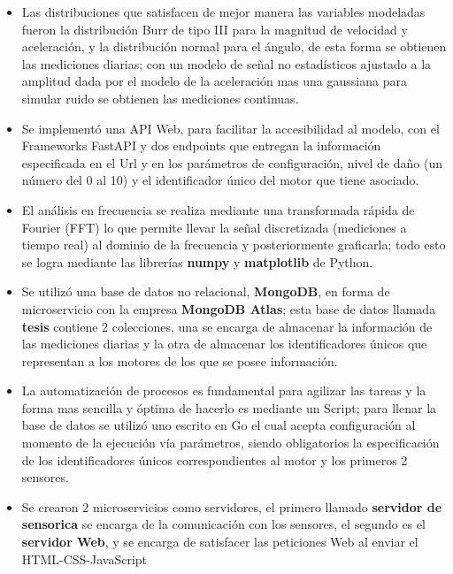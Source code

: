 \begin{itemize}
    \item Las distribuciones que satisfacen de mejor manera las variables
        modeladas fueron la distribución Burr
        de tipo III para la magnitud de velocidad y aceleración, y la distribución
        normal para el ángulo, de esta forma se obtienen las mediciones diarias;
        con un modelo de señal no estadísticos ajustado a la amplitud dada por
        el modelo de la aceleración mas una gaussiana para simular ruido se obtienen
        las mediciones continuas.
    \item Se implementó una API Web, para facilitar la accesibilidad al modelo, con
        el Frameworks FastAPI y dos endpoints que entregan la información especificada
        en el Url y en los parámetros de configuración, nivel de daño (un número del 0 al 10)
        y el identificador único del motor que tiene asociado.
    \item El análisis en frecuencia se realiza mediante una
        transformada rápida de Fourier (FFT) lo que permite llevar la señal
        discretizada (mediciones a tiempo real) al dominio de la frecuencia
        y posteriormente graficarla; todo esto se logra mediante las librerías
        \textbf{numpy} y \textbf{matplotlib} de Python.
    \item  Se utilizó una base de datos no relacional, \textbf{MongoDB}, en forma
        de microservicio con la empresa \textbf{MongoDB Atlas};
        esta base de datos llamada \textbf{tesis}
        contiene 2 colecciones, una se encarga de almacenar la información de las
        mediciones diarias y la otra de almacenar los identificadores únicos que
        representan a los motores de los que se posee información.
    \item La automatización de procesos es fundamental para agilizar las tareas y
        la forma mas sencilla y óptima de hacerlo es mediante un Script; para
        llenar la base de datos se utilizó uno escrito en Go el cual acepta
        configuración al momento de la ejecución vía parámetros, siendo obligatorios
        la especificación de los identificadores únicos correspondientes al motor
        y los primeros 2 sensores.
    \item Se crearon 2 microservicios como servidores, el primero llamado
        \textbf{servidor de sensorica}
        se encarga de la comunicación con los sensores, el segundo es el \textbf{servidor Web},
        y se encarga de satisfacer las peticiones Web al enviar el HTML-CSS-JavaScript

\end{itemize}
